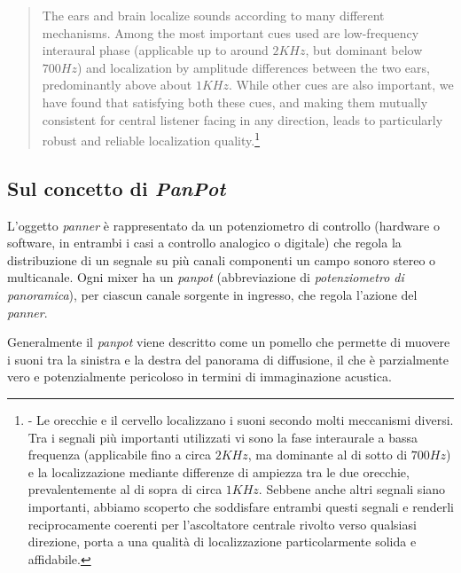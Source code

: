\begin{quotation}
The ears and brain localize sounds according to many different mechanisms. Among
the most important cues used are low-frequency interaural phase (applicable up
to around $2KHz$, but dominant below $700Hz$) and localization by
amplitude differences between the two ears, predominantly above about
$1KHz$. While other cues are also important, we have found that satisfying
both these cues, and making them mutually consistent for central listener facing
in any direction, leads to particularly robust and reliable localization
quality.\footnote{\cite{mg92pdmsss} - Le orecchie e il cervello localizzano i
suoni secondo molti meccanismi diversi. Tra i segnali più importanti utilizzati
vi sono la fase interaurale a bassa frequenza (applicabile fino a circa $2KHz$,
ma dominante al di sotto di $700Hz$) e la localizzazione mediante
differenze di ampiezza tra le due orecchie, prevalentemente al di sopra di
circa $1KHz$. Sebbene anche altri segnali siano importanti, abbiamo
scoperto che soddisfare entrambi questi segnali e renderli reciprocamente
coerenti per l'ascoltatore centrale rivolto verso qualsiasi direzione, porta
a una qualità di localizzazione particolarmente solida e affidabile.}
\end{quotation}

\subsection{Sul concetto di \emph{PanPot}}
\label{sec:panpot}

L'oggetto \emph{panner} è rappresentato da un potenziometro di controllo
(hardware o software, in entrambi i casi a controllo analogico o digitale) che
regola la distribuzione di un segnale su più canali componenti un campo sonoro
stereo o multicanale. Ogni mixer ha un \emph{panpot} (abbreviazione di
\emph{potenziometro di panoramica}), per ciascun canale sorgente in ingresso,
che regola l'azione del \emph{panner}.


Generalmente il \emph{panpot} viene descritto come un pomello che permette di
muovere i suoni tra la sinistra e la destra del panorama di diffusione, il che è
parzialmente vero e potenzialmente pericoloso in termini di immaginazione
acustica.

